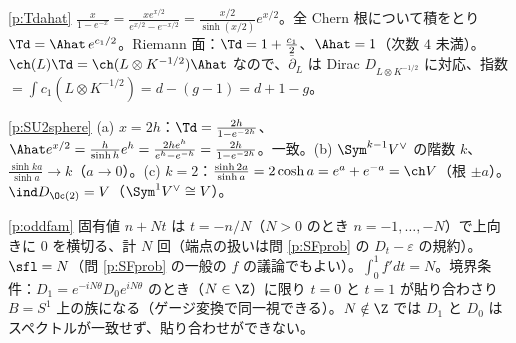 \begin{sol}{\ref{p:Tdahat}}
$\frac x{1-e^{-x}}=\frac{xe^{x/2}}{e^{x/2}-e^{-x/2}}=\frac{x/2}{\sinh(x/2)}e^{x/2}$。全 Chern 根について積をとり $\Td=\Ahat\,e^{c_1/2}$。Riemann 面：$\Td=1+\frac{c_1}2$、$\Ahat=1$（次数 $4$ 未満）。$\ch(L)\Td=\ch(L\otimes K^{-1/2})\Ahat$ なので、$\bar\partial_L$ は Dirac $D_{L\otimes K^{-1/2}}$ に対応、指数 $=\int c_1(L\otimes K^{-1/2})=d-(g-1)=d+1-g$。
\end{sol}
\begin{sol}{\ref{p:SU2sphere}}
(a) $x=2h$：$\Td=\frac{2h}{1-e^{-2h}}$、$\Ahat e^{x/2}=\frac{h}{\sinh h}e^h=\frac{2he^h}{e^h-e^{-h}}=\frac{2h}{1-e^{-2h}}$。一致。(b) $\Sym^{k-1}V^\vee$ の階数 $k$、$\frac{\sinh ka}{\sinh a}\to k$（$a\to0$）。(c) $k=2$：$\frac{\sinh2a}{\sinh a}=2\cosh a=e^a+e^{-a}=\ch V$（根 $\pm a$）。$\ind D_{\Oc(2)}=V$（$\Sym^1V^\vee\cong V$）。
\end{sol}
\begin{sol}{\ref{p:oddfam}}
固有値 $n+Nt$ は $t=-n/N$（$N>0$ のとき $n=-1,\dots,-N$）で上向きに $0$ を横切る、計 $N$ 回（端点の扱いは問 \ref{p:SFprob} の $D_t-\varepsilon$ の規約）。$\sfl=N$（問 \ref{p:SFprob} の一般の $f$ の議論でもよい）。$\int_0^1f'dt=N$。境界条件：$D_1=e^{-iN\theta}D_0e^{iN\theta}$ のとき（$N\in\Z$）に限り $t=0$ と $t=1$ が貼り合わさり $B=S^1$ 上の族になる（ゲージ変換で同一視できる）。$N\notin\Z$ では $D_1$ と $D_0$ はスペクトルが一致せず、貼り合わせができない。
\end{sol}
